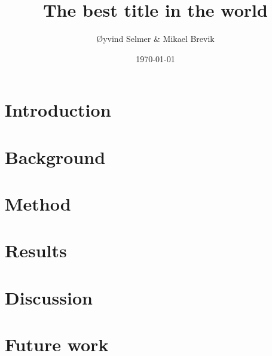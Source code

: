 \documentclass[a4paper, 11pt]{report}
\title{The best title in the world}
\author{Øyvind Selmer \& Mikael Brevik}
\date{\today}
\begin{document}
\maketitle

\tableofcontents

\listoffigures



\chapter{Introduction}
	

\chapter{Background}
	
	
\chapter{Method}

\chapter{Results}

\chapter{Discussion}

\chapter{Future work}




\end{document}

